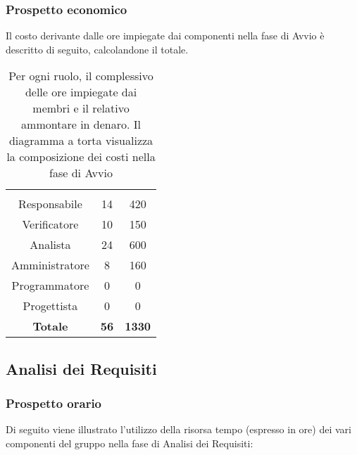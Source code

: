 \subsubsection{Prospetto economico}
Il costo derivante dalle ore impiegate dai componenti nella fase di Avvio è descritto di seguito, calcolandone il totale.

\begin{table}[H]
{\setlength{\parindent}{0cm}
\begin{minipage}{.43\textwidth}
	\begin{tabular}{ccc}
	\rowcolorhead
	\headertitle{Ruolo} & \headertitle{Ore} & \headertitle{Costo(\euro{})}\\
	Responsabile & 14 & 420\\
	Verificatore & 10 & 150\\
	Analista & 24 & 600\\
	Amministratore & 8 & 160\\
	Programmatore & 0 & 0\\
	Progettista & 0 & 0\\
	\hline
	\textbf{Totale} & \textbf{56} & \textbf{1330}\\
	\end{tabular}
\end{minipage}%
\begin{minipage}{.57\textwidth}
\end{minipage} }
\caption[Prospetto economico della fase di Avvio]{Per ogni ruolo, il complessivo delle ore impiegate dai membri e il relativo ammontare in denaro. Il diagramma a torta visualizza la composizione dei costi nella fase di Avvio}
\end{table}



\subsection{Analisi dei Requisiti}

\subsubsection{Prospetto orario}
Di seguito viene illustrato l'utilizzo della risorsa tempo (espresso in ore) dei vari componenti del gruppo nella fase di Analisi dei Requisiti:

